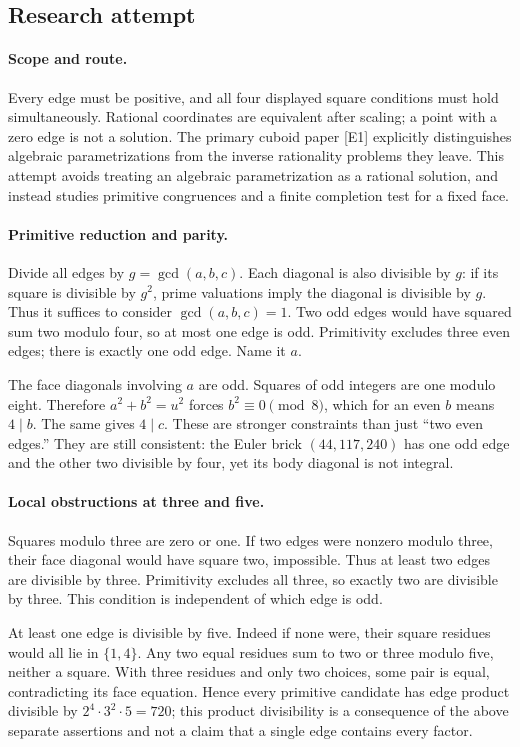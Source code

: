 \documentclass[11pt,a4paper]{article}
\begin{document}
\subsection{Research attempt}

\paragraph{Scope and route.}
Every edge must be positive, and all four displayed square conditions
must hold simultaneously. Rational coordinates are equivalent after
scaling; a point with a zero edge is not a solution. The primary cuboid
paper [E1] explicitly distinguishes algebraic parametrizations from the
inverse rationality problems they leave. This attempt avoids treating an
algebraic parametrization as a rational solution, and instead studies
primitive congruences and a finite completion test for a fixed face.

\paragraph{Primitive reduction and parity.}
Divide all edges by $g=\gcd(a,b,c)$. Each diagonal is also divisible
by $g$: if its square is divisible by $g^2$, prime valuations imply
the diagonal is divisible by $g$. Thus it suffices to consider
$\gcd(a,b,c)=1$. Two odd edges would have squared sum two modulo four,
so at most one edge is odd. Primitivity excludes three even edges;
there is exactly one odd edge. Name it $a$.

The face diagonals involving $a$ are odd. Squares of odd integers are
one modulo eight. Therefore $a^2+b^2=u^2$ forces $b^2\equiv0\pmod8$,
which for an even $b$ means $4\mid b$. The same gives $4\mid c$.
These are stronger constraints than just ``two even edges.'' They are
still consistent: the Euler brick $(44,117,240)$ has one odd edge and
the other two divisible by four, yet its body diagonal is not integral.

\paragraph{Local obstructions at three and five.}
Squares modulo three are zero or one. If two edges were nonzero modulo
three, their face diagonal would have square two, impossible. Thus at
least two edges are divisible by three. Primitivity excludes all three,
so exactly two are divisible by three. This condition is independent
of which edge is odd.

At least one edge is divisible by five. Indeed if none were, their
square residues would all lie in $\{1,4\}$. Any two equal residues
sum to two or three modulo five, neither a square. With three residues
and only two choices, some pair is equal, contradicting its face
equation. Hence every primitive candidate has edge product divisible
by $2^4\cdot3^2\cdot5=720$; this product divisibility is a consequence
of the above separate assertions and not a claim that a single edge
contains every factor.
\end{document}
